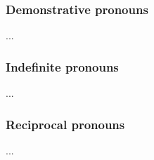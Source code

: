 \subsubsection{Demonstrative pronouns}

...

\subsubsection{Indefinite pronouns}

...

\subsubsection{Reciprocal pronouns}

...




